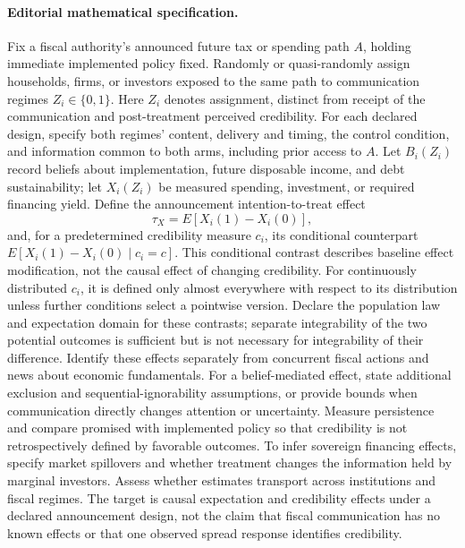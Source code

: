 \documentclass[11pt,a4paper]{article}
\begin{document}
\paragraph{Editorial mathematical specification.} Fix a fiscal authority’s announced future tax or spending path \(A\), holding immediate implemented policy fixed. Randomly or quasi-randomly assign households, firms, or investors exposed to the same path to communication regimes \(Z_i\in\{0,1\}\). Here \(Z_i\) denotes assignment, distinct from receipt of the communication and post-treatment perceived credibility. For each declared design, specify both regimes' content, delivery and timing, the control condition, and information common to both arms, including prior access to \(A\). Let \(B_i(Z_i)\) record beliefs about implementation, future disposable income, and debt sustainability; let \(X_i(Z_i)\) be measured spending, investment, or required financing yield. Define the announcement intention-to-treat effect
\[
\tau_X=E[X_i(1)-X_i(0)],
\]
and, for a predetermined credibility measure \(c_i\), its conditional counterpart \(E[X_i(1)-X_i(0)\mid c_i=c]\). This conditional contrast describes baseline effect modification, not the causal effect of changing credibility. For continuously distributed \(c_i\), it is defined only almost everywhere with respect to its distribution unless further conditions select a pointwise version. Declare the population law and expectation domain for these contrasts; separate integrability of the two potential outcomes is sufficient but is not necessary for integrability of their difference.
Identify these effects separately from concurrent fiscal actions and news about economic fundamentals. For a belief-mediated effect, state additional exclusion and sequential-ignorability assumptions, or provide bounds when communication directly changes attention or uncertainty. Measure persistence and compare promised with implemented policy so that credibility is not retrospectively defined by favorable outcomes. To infer sovereign financing effects, specify market spillovers and whether treatment changes the information held by marginal investors. Assess whether estimates transport across institutions and fiscal regimes. The target is causal expectation and credibility effects under a declared announcement design, not the claim that fiscal communication has no known effects or that one observed spread response identifies credibility.
\end{document}
